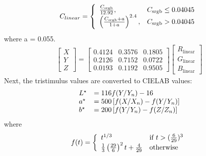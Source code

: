 \begin{eqnarray}
C_{linear} = \left\{
  \begin{array}{l l}
  	\frac{C_\mathrm{srgb}}{12.92}, & C_\mathrm{srgb}\le0.04045\\
	\left(\frac{C_\mathrm{srgb}+a}{1+a}\right)^{2.4}, & C_\mathrm{srgb}>0.04045
  \end{array} \right. 
\end{eqnarray}
where a = 0.055.
\begin{eqnarray}
\begin{bmatrix}
X\\Y\\Z\end{bmatrix}=
\begin{bmatrix}
0.4124&0.3576&0.1805\\
0.2126&0.7152&0.0722\\
0.0193&0.1192&0.9505
\end{bmatrix}
\begin{bmatrix}
R_\mathrm{linear}\\ 
G_\mathrm{linear}\\ 
B_\mathrm{linear}
\end{bmatrix}
\end{eqnarray}
Next, the tristimulus values are converted to CIELAB values:
\begin{eqnarray}
\left.
  \begin{array}{l l}
   L^\star & = 116 f(Y/Y_n) - 16\\
   a^\star & = 500 \left[f(X/X_n) - f(Y/Y_n)\right]\\
   b^\star & = 200 \left[f(Y/Y_n) - f(Z/Z_n)\right]
  \end{array} \right. 
\end{eqnarray}
where 
\begin{eqnarray}
f(t) = \left\{
  \begin{array}{l l}
  t^{1/3} & \text{if } t > (\frac{6}{29})^3 \\
  \frac13 \left( \frac{29}{6} \right)^2 t + \frac{4}{29} & \text{otherwise}
\end{array} \right. 
\end{eqnarray}
